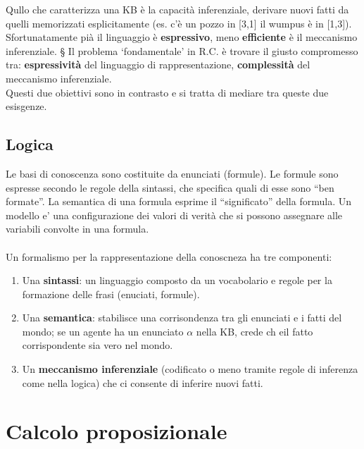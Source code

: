 Qullo che caratterizza una KB è la capacità inferenziale, derivare nuovi fatti da quelli memorizzati esplicitamente (es. c'è un pozzo in [3,1] il wumpus è in [1,3]).\\
Sfortunatamente pià il linguaggio è \textbf{espressivo}, meno \textbf{efficiente} è il meccanismo inferenziale. § Il problema ‘fondamentale’ in R.C. è trovare il giusto
compromesso tra: \textbf{espressività} del linguaggio di rappresentazione, \textbf{complessità} del meccanismo inferenziale.\\
Questi due obiettivi sono in contrasto e si tratta di mediare tra queste due esisgenze.

\subsection{Logica}
Le basi di conoscenza sono costituite da enunciati (formule). Le formule sono espresse secondo le regole della sintassi,
che specifica quali di esse sono “ben formate”. La semantica di una formula esprime il “significato” della
formula. Un modello e’ una configurazione dei valori di verità che si possono assegnare alle variabili convolte in una formula.\\\\
Un formalismo per la rappresentazione della conoscneza ha tre componenti:
\begin{enumerate}
    \item Una \textbf{sintassi}: un linguaggio composto da un vocabolario e regole per la formazione delle frasi (enuciati, formule).
    \item Una \textbf{semantica}: stabilisce una corrisondenza tra gli enunciati e i fatti del mondo; se un agente ha un enunciato $\alpha$ nella KB, crede ch eil fatto corrispondente sia vero nel mondo.
    \item Un \textbf{meccanismo inferenziale} (codificato o meno tramite regole di inferenza come nella logica) che ci consente di inferire nuovi fatti.
\end{enumerate}

\newpage
\section{Calcolo proposizionale}
